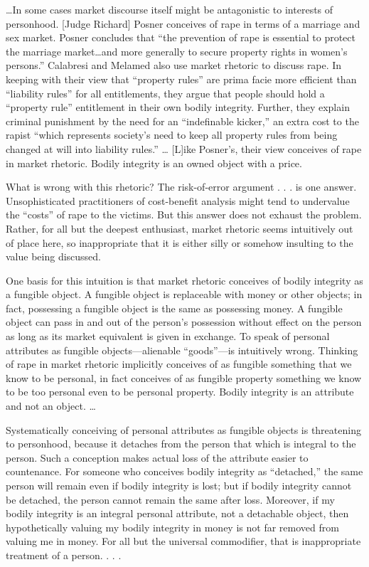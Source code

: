 
\dots In some cases market discourse itself might be antagonistic to interests
of personhood. [Judge Richard] Posner conceives of rape in terms of a marriage
and sex market. Posner concludes that ``the prevention of rape is essential to
protect the marriage market\ldots and more generally to secure property rights
in women's persons.'' Calabresi and Melamed also use market rhetoric to discuss
rape. In keeping with their view that ``property rules'' are prima facie more
efficient than ``liability rules'' for all entitlements, they argue that people
should hold a ``property rule'' entitlement in their own bodily integrity.
Further, they explain criminal punishment by the need for an ``indefinable
kicker,'' an extra cost to the rapist ``which represents society's need to keep
all property rules from being changed at will into liability rules.'' {\dots}
[L]ike Posner's, their view conceives of rape in market rhetoric. Bodily
integrity is an owned object with a price.

What is wrong with this rhetoric? The risk-of-error argument . . . is one
answer. Unsophisticated practitioners of cost-benefit analysis might tend to
undervalue the ``costs'' of rape to the victims. But this answer does not
exhaust the problem. Rather, for all but the deepest enthusiast, market
rhetoric seems intuitively out of place here, so inappropriate that it is
either silly or somehow insulting to the value being discussed.

One basis for this intuition is that market rhetoric conceives of bodily
integrity as a fungible object. A fungible object is replaceable with money or
other objects; in fact, possessing a fungible object is the same as possessing
money. A fungible object can pass in and out of the person's possession without
effect on the person as long as its market equivalent is given in exchange. To
speak of personal attributes as fungible objects---alienable ``goods''---is
intuitively wrong. Thinking of rape in market rhetoric implicitly
conceives of as fungible something that we know to be personal, in fact
conceives of as fungible property something we know to be too personal even to
be personal property. Bodily integrity is an attribute and not an object.
{\dots}

Systematically conceiving of personal attributes as fungible objects is
threatening to personhood, because it detaches from the person that which is
integral to the person. Such a conception makes actual loss of the attribute
easier to countenance. For someone who conceives bodily integrity as
``detached,'' the same person will remain even if bodily integrity is lost; but
if bodily integrity cannot be detached, the person cannot remain the same after
loss. Moreover, if my bodily integrity is an integral personal attribute, not a
detachable object, then hypothetically valuing my bodily integrity in money is
not far removed from valuing me in money. For all but the universal
commodifier, that is inappropriate treatment of a person. . . .

